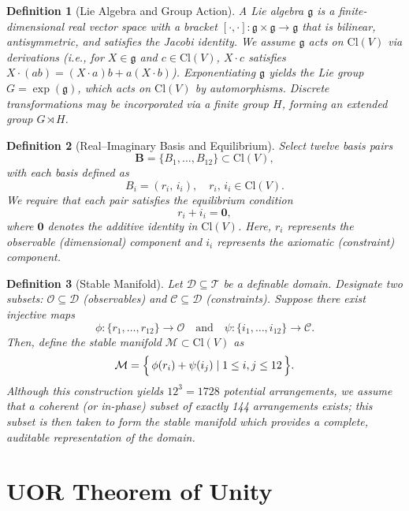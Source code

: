 \documentclass{article}
\newtheorem{definition}{Definition}[section]
\begin{document}
\begin{definition}[Lie Algebra and Group Action]
\label{def:lieaction}
A \emph{Lie algebra} $\mathfrak{g}$ is a finite-dimensional real vector space with a bracket $[\cdot,\cdot]:\mathfrak{g}\times\mathfrak{g}\to \mathfrak{g}$ that is bilinear, antisymmetric, and satisfies the Jacobi identity. We assume $\mathfrak{g}$ acts on $\mathrm{Cl}(V)$ via derivations (i.e., for $X\in \mathfrak{g}$ and $c\in\mathrm{Cl}(V)$, $X\cdot c$ satisfies $X\cdot (ab) = (X\cdot a)b + a(X\cdot b)$). Exponentiating $\mathfrak{g}$ yields the Lie group $G = \exp(\mathfrak{g})$, which acts on $\mathrm{Cl}(V)$ by automorphisms. Discrete transformations may be incorporated via a finite group $H$, forming an extended group $G \rtimes H$.
\end{definition}

\begin{definition}[Real--Imaginary Basis and Equilibrium]
\label{def:realimag}
Select twelve basis pairs 
\[
\mathbf{B} = \{B_1,\dots,B_{12}\} \subset \mathrm{Cl}(V),
\]
with each basis defined as 
\[
B_i = (r_i,\, i_i), \quad r_i,\, i_i \in \mathrm{Cl}(V).
\]
We require that each pair satisfies the equilibrium condition
\[
r_i + i_i = \mathbf{0},
\]
where $\mathbf{0}$ denotes the additive identity in $\mathrm{Cl}(V)$. Here, $r_i$ represents the \emph{observable} (dimensional) component and $i_i$ represents the \emph{axiomatic} (constraint) component.
\end{definition}

\begin{definition}[Stable Manifold]
\label{def:stablemanifold}
Let $\mathcal{D}\subseteq \mathcal{T}$ be a definable domain. Designate two subsets: $\mathcal{O}\subseteq\mathcal{D}$ (observables) and $\mathcal{C}\subseteq\mathcal{D}$ (constraints). Suppose there exist injective maps 
\[
\phi:\{r_1,\dots,r_{12}\}\to \mathcal{O} \quad \text{and} \quad \psi:\{i_1,\dots,i_{12}\}\to \mathcal{C}.
\]
Then, define the \emph{stable manifold} $\mathcal{M} \subset \mathrm{Cl}(V)$ as
\[
\mathcal{M} = \Bigl\{\,\phi(r_i) + \psi(i_j) \mid 1 \le i,j \le 12\,\Bigr\}.
\]
Although this construction yields $12^3 = 1728$ potential arrangements, we assume that a coherent (or \emph{in-phase}) subset of exactly 144 arrangements exists; this subset is then taken to form the stable manifold which provides a complete, auditable representation of the domain.
\end{definition}

\section{UOR Theorem of Unity}
\end{document}
